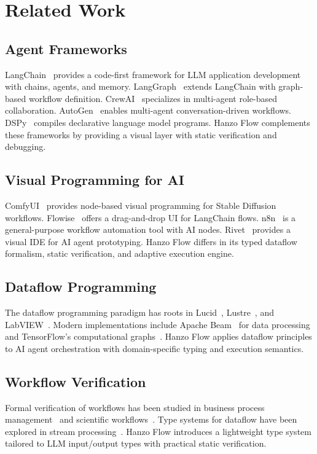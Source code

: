 \section{Related Work}

\label{sec:related}

\subsection{Agent Frameworks}

LangChain~\cite{langchain2023} provides a code-first framework for LLM application development with chains, agents, and memory. LangGraph~\cite{langgraph2024} extends LangChain with graph-based workflow definition. CrewAI~\cite{crewai2024} specializes in multi-agent role-based collaboration. AutoGen~\cite{wu2023autogen} enables multi-agent conversation-driven workflows. DSPy~\cite{khattab2023dspy} compiles declarative language model programs. Hanzo Flow complements these frameworks by providing a visual layer with static verification and debugging.

\subsection{Visual Programming for AI}

ComfyUI~\cite{comfyui2023} provides node-based visual programming for Stable Diffusion workflows. Flowise~\cite{flowise2023} offers a drag-and-drop UI for LangChain flows. n8n~\cite{n8n2024} is a general-purpose workflow automation tool with AI nodes. Rivet~\cite{rivet2023} provides a visual IDE for AI agent prototyping. Hanzo Flow differs in its typed dataflow formalism, static verification, and adaptive execution engine.

\subsection{Dataflow Programming}

The dataflow programming paradigm has roots in Lucid~\cite{wadge1985lucid}, Lustre~\cite{halbwachs1991synchronous}, and LabVIEW~\cite{labview2003}. Modern implementations include Apache Beam~\cite{beam2016} for data processing and TensorFlow's computational graphs~\cite{abadi2016tensorflow}. Hanzo Flow applies dataflow principles to AI agent orchestration with domain-specific typing and execution semantics.

\subsection{Workflow Verification}

Formal verification of workflows has been studied in business process management~\cite{van2003workflow} and scientific workflows~\cite{deelman2005pegasus}. Type systems for dataflow have been explored in stream processing~\cite{hirzel2014catalog}. Hanzo Flow introduces a lightweight type system tailored to LLM input/output types with practical static verification.

